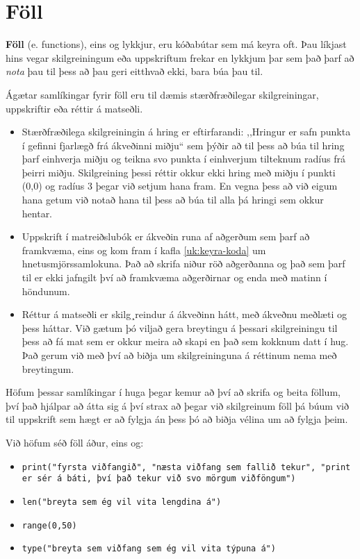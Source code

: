 
\chapter{Föll}\label{k:föll}
\textbf{Föll} (e. functions), eins og lykkjur, eru kóðabútar sem má keyra oft.
Þau líkjast hins vegar skilgreiningum eða uppskriftum frekar en lykkjum þar sem það þarf að \emph{nota} þau til þess að þau geri eitthvað ekki, bara búa þau til.

Ágætar samlíkingar fyrir föll eru til dæmis stærðfræðilegar skilgreiningar, uppskriftir eða réttir á matseðli.

\begin{itemize}
	\item Stærðfræðilega skilgreiningin á hring er eftirfarandi: ,,Hringur er safn punkta í gefinni fjarlægð frá ákveðinni miðju“ sem þýðir að til þess að búa til hring þarf einhverja miðju og teikna svo punkta í einhverjum tilteknum radíus frá þeirri miðju.
	Skilgreining þessi réttir okkur ekki hring með miðju í punkti (0,0) og radíus 3 þegar við setjum hana fram.
	En vegna þess að við eigum hana getum við notað hana til þess að búa til alla þá hringi sem okkur hentar.
	\item Uppskrift í matreiðslubók er ákveðin runa af aðgerðum sem þarf að framkvæma, eins og kom fram í kafla \ref{uk:keyra-koda} um hnetusmjörssamlokuna.
	Það að skrifa niður röð aðgerðanna og það sem þarf til er ekki jafngilt því að framkvæma aðgerðirnar og enda með matinn í höndunum.
	\item Réttur á matseðli er skilg¸reindur á ákveðinn hátt, með ákveðnu meðlæti og þess háttar.
	Við gætum þó viljað gera breytingu á þessari skilgreiningu til þess að fá mat sem er okkur meira að skapi en það sem kokknum datt í hug.
	Það gerum við með því að biðja um skilgreininguna á réttinum nema með breytingum.
\end{itemize}

Höfum þessar samlíkingar í huga þegar kemur að því að skrifa og beita föllum, því það hjálpar að átta sig á því strax að þegar við skilgreinum föll þá búum við til uppskrift sem hægt er að fylgja án þess þó að biðja vélina um að fylgja þeim.

Við höfum séð föll áður, eins og: 

\begin{itemize}
	\item \texttt{print("fyrsta viðfangið", "næsta viðfang sem fallið tekur", "print er sér á báti, því það tekur við svo mörgum viðföngum")}
	\item \texttt{len("breyta sem ég vil vita lengdina á")}
	\item \texttt{range(0,50)}
	\item \texttt{type("breyta sem viðfang sem ég vil vita týpuna á")}
\end{itemize}

